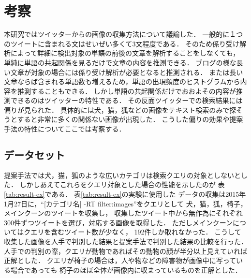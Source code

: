 \chapter{考察}
\label{sec:examination}

本研究ではツイッターからの画像の収集方法について議論した．
一般的に１つのツイートに含まれる文はせいぜい多くて3文程度である．
そのため係り受け解析によって詳細に検出対象の単語の前後の文章を解析することをしなくても，
単純に単語の共起関係を見るだけで文章の内容を推測できる．
ブログの様な長い文章が対象の場合には係り受け解析が必要となると推測される．
または長い文章ならば含まれる単語数も増えるため，単語の出現頻度のヒストグラムから内容を推測することもできる．
しかし単語の共起関係だけでおおよその内容が推測できるのはツイッターの特性である．
その反面ツイッターでの検索結果には偏りが見られた．
具体的には犬，猫，狐などの画像をテキスト検索のみで探そうとすると非常に多くの関係ない画像が出現した．
こうした偏りの効果や提案手法の特性についてここでは考察する．



\section{データセット}

提案手法では犬，猫，狐のような広いカテゴリは検索クエリの対象としないとした．
しかしあえてこれらをクエリ対象とした場合の性能を示したのが
表\ref{tab:result-ex}である．
表\ref{tab:result-ex}の実験に使用した
データの収集は2015年1月27日に，``[カテゴリ名] -RT filter:images''をクエリとして
犬，猫，狐，椅子，メインクーンのツイートを収集し，
収集したツイート中から無作為にそれぞれ300件ずつツイートを選び，対応する画像を取得した．
ただしメインクーンについてはクエリを含むツイート数が少なく，
192件しか取れなかった．
%
%
こうして収集した画像を人手で判別した結果と提案手法で判別した結果の比較を行った．
%
人手での判別の際，クエリが動物であればその動物の顔が半分以上見えていれば正解とした．
クエリが椅子の場合は，人や物などの障害物が画像中に写っている場合であっても
椅子のほぼ全体が画像内に収まっているものを正解とした．

